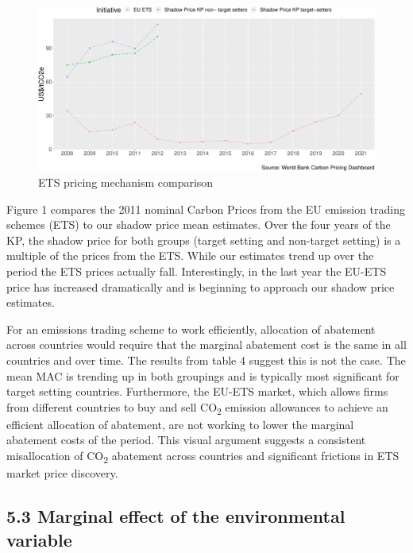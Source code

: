 \documentclass[
  10pt,
]{article}
\begin{document}
\begin{figure}[H]
\includegraphics{figures/paper-ETS comparision-1} \caption{ETS pricing mechanism comparison}\label{fig:ETS comparision}
\end{figure}

Figure 1 compares the 2011 nominal Carbon Prices from the EU emission
trading schemes (ETS) to our shadow price mean estimates. Over the four
years of the KP, the shadow price for both groups (target setting and
non-target setting) is a multiple of the prices from the ETS. While our
estimates trend up over the period the ETS prices actually fall.
Interestingly, in the last year the EU-ETS price has increased
dramatically and is beginning to approach our shadow price estimates.

For an emissions trading scheme to work efficiently, allocation of
abatement across countries would require that the marginal abatement
cost is the same in all countries and over time. The results from table
4 suggest this is not the case. The mean MAC is trending up in both
groupings and is typically most significant for target setting
countries. Furthermore, the EU-ETS market, which allows firms from
different countries to buy and sell CO\textsubscript{2} emission
allowances to achieve an efficient allocation of abatement, are not
working to lower the marginal abatement costs of the period. This visual
argument suggests a consistent misallocation of CO\textsubscript{2}
abatement across countries and significant frictions in ETS market price
discovery.

\hypertarget{marginal-effect-of-the-environmental-variable}{%
\subsection{5.3 Marginal effect of the environmental
variable}\label{marginal-effect-of-the-environmental-variable}}
\end{document}
